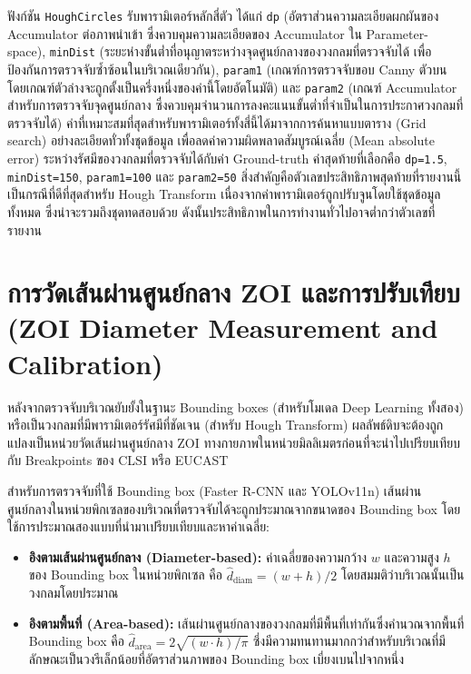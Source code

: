 ฟังก์ชัน \texttt{HoughCircles} รับพารามิเตอร์หลักสี่ตัว ได้แก่ \texttt{dp} (อัตราส่วนความละเอียดผกผันของ Accumulator ต่อภาพนำเข้า ซึ่งควบคุมความละเอียดของ Accumulator ใน Parameter-space), \texttt{minDist} (ระยะห่างขั้นต่ำที่อนุญาตระหว่างจุดศูนย์กลางของวงกลมที่ตรวจจับได้ เพื่อป้องกันการตรวจจับซ้ำซ้อนในบริเวณเดียวกัน), \texttt{param1} (เกณฑ์การตรวจจับขอบ Canny ตัวบน โดยเกณฑ์ตัวล่างจะถูกตั้งเป็นครึ่งหนึ่งของค่านี้โดยอัตโนมัติ) และ \texttt{param2} (เกณฑ์ Accumulator สำหรับการตรวจจับจุดศูนย์กลาง ซึ่งควบคุมจำนวนการลงคะแนนขั้นต่ำที่จำเป็นในการประกาศวงกลมที่ตรวจจับได้) ค่าที่เหมาะสมที่สุดสำหรับพารามิเตอร์ทั้งสี่นี้ได้มาจากการค้นหาแบบตาราง (Grid search) อย่างละเอียดทั่วทั้งชุดข้อมูล เพื่อลดค่าความผิดพลาดสัมบูรณ์เฉลี่ย (Mean absolute error) ระหว่างรัศมีของวงกลมที่ตรวจจับได้กับค่า Ground-truth ค่าสุดท้ายที่เลือกคือ \texttt{dp=1.5}, \texttt{minDist=150}, \texttt{param1=100} และ \texttt{param2=50} สิ่งสำคัญคือตัวเลขประสิทธิภาพสุดท้ายที่รายงานนี้เป็นกรณีที่ดีที่สุดสำหรับ Hough Transform เนื่องจากค่าพารามิเตอร์ถูกปรับจูนโดยใช้ชุดข้อมูลทั้งหมด ซึ่งน่าจะรวมถึงชุดทดสอบด้วย ดังนั้นประสิทธิภาพในการทำงานทั่วไปอาจต่ำกว่าตัวเลขที่รายงาน

\section{การวัดเส้นผ่านศูนย์กลาง ZOI และการปรับเทียบ (ZOI Diameter Measurement and Calibration)}

หลังจากตรวจจับบริเวณยับยั้งในฐานะ Bounding boxes (สำหรับโมเดล Deep Learning ทั้งสอง) หรือเป็นวงกลมที่มีพารามิเตอร์รัศมีที่ชัดเจน (สำหรับ Hough Transform) ผลลัพธ์ดิบจะต้องถูกแปลงเป็นหน่วยวัดเส้นผ่านศูนย์กลาง ZOI ทางกายภาพในหน่วยมิลลิเมตรก่อนที่จะนำไปเปรียบเทียบกับ Breakpoints ของ CLSI หรือ EUCAST

สำหรับการตรวจจับที่ใช้ Bounding box (Faster R-CNN และ YOLOv11n) เส้นผ่านศูนย์กลางในหน่วยพิกเซลของบริเวณที่ตรวจจับได้จะถูกประมาณจากขนาดของ Bounding box โดยใช้การประมาณสองแบบที่นำมาเปรียบเทียบและหาค่าเฉลี่ย:
\begin{itemize}
  \item \textbf{อิงตามเส้นผ่านศูนย์กลาง (Diameter-based):} ค่าเฉลี่ยของความกว้าง $w$ และความสูง $h$ ของ Bounding box ในหน่วยพิกเซล คือ $\hat{d}_{\mathrm{diam}} = (w + h)/2$ โดยสมมติว่าบริเวณนั้นเป็นวงกลมโดยประมาณ
  \item \textbf{อิงตามพื้นที่ (Area-based):} เส้นผ่านศูนย์กลางของวงกลมที่มีพื้นที่เท่ากันซึ่งคำนวณจากพื้นที่ Bounding box คือ $\hat{d}_{\mathrm{area}} = 2\sqrt{(w \cdot h)/\pi}$ ซึ่งมีความทนทานมากกว่าสำหรับบริเวณที่มีลักษณะเป็นวงรีเล็กน้อยที่อัตราส่วนภาพของ Bounding box เบี่ยงเบนไปจากหนึ่ง
\end{itemize}

